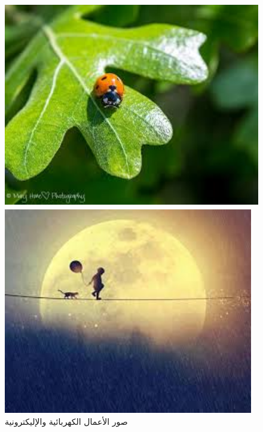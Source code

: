 \documentclass{article}
\begin{document}
\begin{figure}[H]
    \begin{minipage}{0.45\textwidth}
        \centering
        \includegraphics[height=9cm,width=\textwidth]{electric/3.jpg}
    \end{minipage}
    \hfill
    \begin{minipage}{0.45\textwidth}
        \centering
        \includegraphics[height=9cm,width=\textwidth]{electric/4.jpg}
    \end{minipage}
        \caption{صور الأعمال الكهربائية والإليكترونية}
\end{figure}
\end{document}
